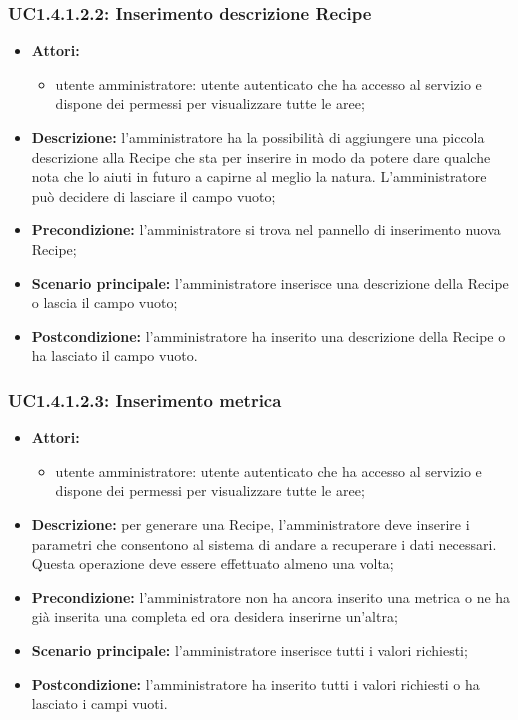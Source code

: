 \subsubsection{UC1.4.1.2.2: Inserimento descrizione Recipe}
\begin{itemize}
	\item \textbf{Attori:}
	\begin{itemize}
		\item utente amministratore: utente autenticato che ha accesso al servizio e dispone dei permessi per visualizzare tutte le aree;
	\end{itemize}
	\item \textbf{Descrizione:} l'amministratore ha la possibilità di aggiungere una piccola descrizione alla Recipe che sta per inserire in modo da potere dare qualche nota che lo aiuti in futuro a capirne al meglio la natura. L'amministratore può decidere di lasciare il campo vuoto;
	\item \textbf{Precondizione:} l'amministratore si trova nel pannello di inserimento nuova Recipe;
	\item \textbf{Scenario principale:} l'amministratore inserisce una descrizione della Recipe o lascia il campo vuoto;
	\item \textbf{Postcondizione:} l'amministratore ha inserito una descrizione della Recipe o ha lasciato il campo vuoto.
\end{itemize}

\subsubsection{UC1.4.1.2.3: Inserimento metrica}
\begin{itemize}
	\item \textbf{Attori:}
	\begin{itemize}
		\item utente amministratore: utente autenticato che ha accesso al servizio e dispone dei permessi per visualizzare tutte le aree;
	\end{itemize}
	\item \textbf{Descrizione:} per generare una Recipe, l'amministratore deve inserire i parametri che consentono al sistema di andare a recuperare i dati necessari. Questa operazione deve essere effettuato almeno una volta;
	\item \textbf{Precondizione:} l'amministratore non ha ancora inserito una metrica o ne ha già inserita una completa ed ora desidera inserirne un'altra;
	\item \textbf{Scenario principale:} l'amministratore inserisce tutti i valori richiesti;
	\item \textbf{Postcondizione:} l'amministratore ha inserito tutti i valori richiesti o ha lasciato i campi vuoti.
\end{itemize}



